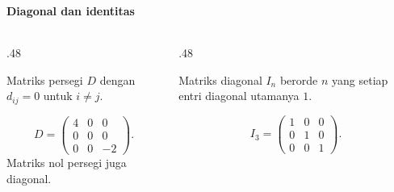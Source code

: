 \documentclass{../../kalkulus-ppt}
\begin{document}
\begin{frame}
    \frametitle{\insertsection}
    \framesubtitle{Diagonal dan identitas}
    \begin{columns}[T,onlytextwidth]
        \begin{column}{.48\textwidth}
            \begin{definisi}
                Matriks persegi $D$ dengan $d_{ij}=0$ untuk $i\ne j$.
            \end{definisi}
            \begin{contoh}
                \[
                    D=\begin{pmatrix}4&0&0\\0&0&0\\0&0&-2\end{pmatrix}.
                \]
                Matriks nol persegi juga diagonal.
            \end{contoh}
        \end{column}
        \begin{column}{.48\textwidth}
            \begin{definisi}
                Matriks diagonal $I_n$ berorde $n$ yang setiap entri diagonal utamanya $1$.
            \end{definisi}
            \begin{contoh}
                \[
                    I_3=\begin{pmatrix}1&0&0\\0&1&0\\0&0&1\end{pmatrix}.
                \]
            \end{contoh}
        \end{column}
    \end{columns}
    \par\smallskip
\end{frame}
\end{document}
